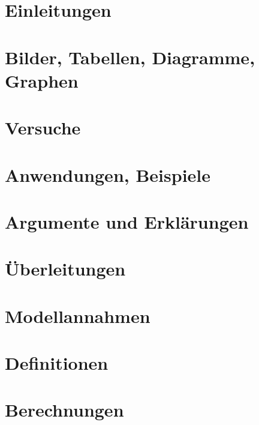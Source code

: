 \documentclass[10pt,a4paper]{scrartcl}
\begin{document}

\newpage

\pagestyle{fancy}
\renewcommand{\headrulewidth}{0.4pt}
\renewcommand{\footrulewidth}{0.4pt}
\fancyhead[C]{~}
\fancyhead[R]{\rightmark}
\fancyfoot[OC]{~}

\tableofcontents

\newpage

\section{Einleitungen}

\section{Bilder, Tabellen, Diagramme, Graphen}


\section{Versuche}

\section{Anwendungen, Beispiele}

\section{Argumente und Erklärungen}

\section{Überleitungen}

\section{Modellannahmen}

\section{Definitionen}

\section{Berechnungen}

\end{document}
